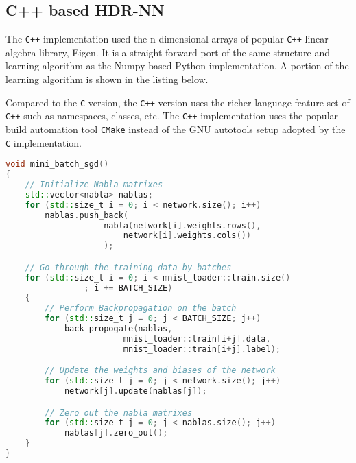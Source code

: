 \subsection{C++ based HDR-NN}

The \texttt{C++} implementation used the n-dimensional arrays of popular \texttt{C++} linear algebra library, Eigen. It is a straight forward port of the same structure and learning algorithm as the Numpy based Python implementation. A portion of the learning algorithm is shown in the listing below.

Compared to the \texttt{C} version, the \texttt{C++} version uses the richer language feature set of \texttt{C++} such as namespaces, classes, etc. The \texttt{C++} implementation uses the popular build automation tool \texttt{CMake} instead of the GNU autotools setup adopted by the \texttt{C} implementation.

\begin{lstlisting}[language=C++]
void mini_batch_sgd()
{
	// Initialize Nabla matrixes
	std::vector<nabla> nablas;
	for (std::size_t i = 0; i < network.size(); i++)
		nablas.push_back(
					nabla(network[i].weights.rows(),
						network[i].weights.cols())
					);

	// Go through the training data by batches
	for (std::size_t i = 0; i < mnist_loader::train.size()
				; i += BATCH_SIZE)
	{
		// Perform Backpropagation on the batch
		for (std::size_t j = 0; j < BATCH_SIZE; j++)
			back_propogate(nablas,
						mnist_loader::train[i+j].data,
						mnist_loader::train[i+j].label);

		// Update the weights and biases of the network
		for (std::size_t j = 0; j < network.size(); j++)
			network[j].update(nablas[j]);

		// Zero out the nabla matrixes
		for (std::size_t j = 0; j < nablas.size(); j++)
			nablas[j].zero_out();
	}
}
\end{lstlisting}